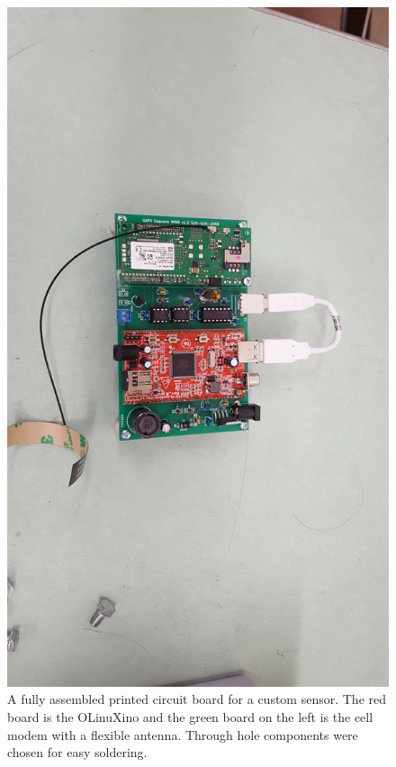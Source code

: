 \begin{figure}[t]
\includegraphics[width=\textwidth]{figs/sensor_board.jpg}
\caption[Assembled sensor circuit board]{A fully assembled printed
  circuit board for a custom sensor. The red board is the OLinuXino
  and the green board on the left is the cell modem with a flexible
  antenna. Through hole components were chosen for easy soldering.}
\label{fig:sensor_board}
\end{figure}

